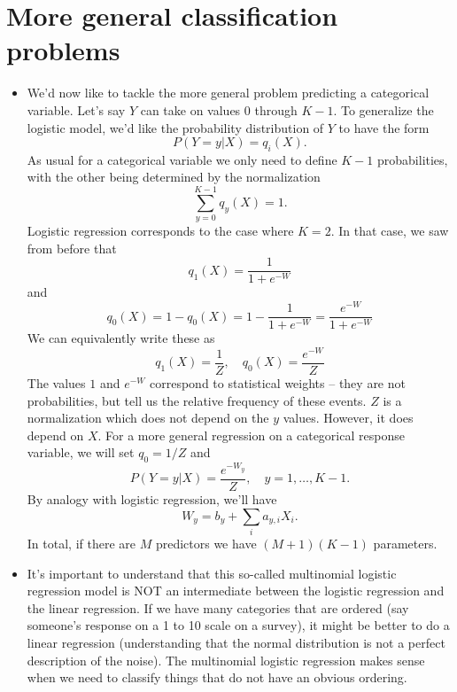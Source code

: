 \section{More general classification problems}
\begin{itemize}
\item We'd now like to tackle the more general problem predicting a categorical variable. Let's say $Y$ can take on values $0$ through $K-1$. To generalize the logistic model, we'd like the probability distribution of $Y$ to have the form 
\begin{equation}
P(Y=y|X) = q_i(X).
\end{equation}
As usual for a categorical variable we only need to define $K-1$ probabilities, with the other being determined by the normalization 
\begin{equation}
\sum_{y=0}^{K-1} q_y(X) = 1.
\end{equation}
Logistic regression corresponds to the case where $K=2$. In that case, we saw from before that 
\begin{equation}
q_1(X) = \frac{1}{1+e^{-W}}
\end{equation}
and 
\begin{equation}
q_0(X) = 1-q_0(X) = 1-\frac{1}{1+e^{-W}}= \frac{e^{-W}}{1+e^{-W}} 
\end{equation}
We can equivalently write these as 
\begin{equation}
q_1(X) = \frac{1}{Z},\quad q_0(X) = \frac{e^{-W}}{Z}
\end{equation}
The values $1$ and $e^{-W}$ correspond to {\dfn statistical weights} -- they are not probabilities, but tell us the relative frequency of these events. $Z$ is a normalization which does not depend on the $y$ values. However, it does depend on $X$. For a more general regression on a categorical response variable, we will set $q_0 = 1/Z$ and  
\begin{equation}
P(Y=y|X) = \frac{e^{-W_y}}{Z},\quad y = 1,\dots,K-1.
\end{equation}
By analogy with logistic regression, we'll have
\begin{equation}
W_y = b_y + \sum_i a_{y,i}X_i.
\end{equation}
In total, if there are $M$ predictors we have $(M+1)(K-1)$ parameters. 
\item It's important to understand that this so-called multinomial logistic regression model is NOT an intermediate between the logistic regression and the linear regression. If we have many categories that are ordered (say someone's response on a 1 to 10 scale on a survey), it might be better to do a linear regression (understanding that the normal distribution is not a perfect description of the noise). The multinomial logistic regression makes sense when we need to classify things that do not have an obvious ordering. 
\end{itemize}


 




